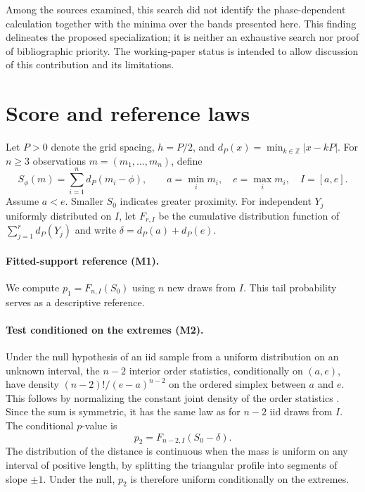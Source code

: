 \documentclass[11pt,a4paper]{article}
\begin{document}
Among the sources examined, this search did not identify the phase-dependent calculation together with the minima over the bands presented here. This finding delineates the proposed specialization; it is neither an exhaustive search nor proof of bibliographic priority. The working-paper status is intended to allow discussion of this contribution and its limitations.

\section{Score and reference laws}

Let $P>0$ denote the grid spacing, $h=P/2$, and $d_P(x)=\min_{k\in\mathbb Z}|x-kP|$. For $n\geq3$ observations $m=(m_1,\ldots,m_n)$, define
\[
S_\phi(m)=\sum_{i=1}^n d_P(m_i-\phi),\qquad
a=\min_i m_i,\quad e=\max_i m_i,\quad I=[a,e].
\]
Assume $a<e$. Smaller $S_0$ indicates greater proximity. For independent $Y_j$ uniformly distributed on $I$, let $F_{r,I}$ be the cumulative distribution function of $\sum_{j=1}^r d_P(Y_j)$ and write $\delta=d_P(a)+d_P(e)$.

\paragraph{Fitted-support reference (M1).}
We compute $p_1=F_{n,I}(S_0)$ using $n$ new draws from $I$. This tail probability serves as a descriptive reference.

\paragraph{Test conditioned on the extremes (M2).}
Under the null hypothesis of an iid sample from a uniform distribution on an unknown interval, the $n-2$ interior order statistics, conditionally on $(a,e)$, have density $(n-2)!/(e-a)^{n-2}$ on the ordered simplex between $a$ and $e$. This follows by normalizing the constant joint density of the order statistics \cite{order}. Since the sum is symmetric, it has the same law as for $n-2$ iid draws from $I$. The conditional $p$-value is
\begin{equation}\label{eq:m2}
p_2=F_{n-2,I}(S_0-\delta).
\end{equation}
The distribution of the distance is continuous when the mass is uniform on any interval of positive length, by splitting the triangular profile into segments of slope $\pm1$. Under the null, $p_2$ is therefore uniform conditionally on the extremes.
\end{document}
